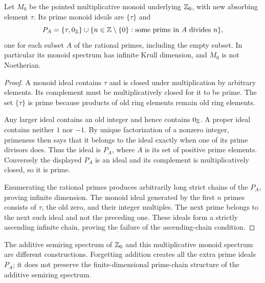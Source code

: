 \begin{proposition}\label{prop:monoid-spectrum}
Let $M_0$ be the pointed multiplicative monoid underlying $\mathbb Z_0$, with new absorbing element $\tau$. Its prime monoid ideals are $\{\tau\}$ and
\[
 P_A=\{\tau,0_\mathbb Z\}\cup
 \{n\in\mathbb Z\setminus\{0\}:\text{some prime in }A\text{ divides }n\},
\]
one for each subset $A$ of the rational primes, including the empty subset. In particular its monoid spectrum has infinite Krull dimension, and $M_0$ is not Noetherian.
\end{proposition}
\begin{proof}
A monoid ideal contains $\tau$ and is closed under multiplication by arbitrary elements. Its complement must be multiplicatively closed for it to be prime. The set $\{\tau\}$ is prime because products of old ring elements remain old ring elements.

Any larger ideal contains an old integer and hence contains $0_\mathbb Z$. A proper ideal contains neither $1$ nor $-1$. By unique factorization of a nonzero integer, primeness then says that it belongs to the ideal exactly when one of its prime divisors does. Thus the ideal is $P_A$, where $A$ is its set of positive prime elements. Conversely the displayed $P_A$ is an ideal and its complement is multiplicatively closed, so it is prime.

Enumerating the rational primes produces arbitrarily long strict chains of the $P_A$, proving infinite dimension. The monoid ideal generated by the first $n$ primes consists of $\tau$, the old zero, and their integer multiples. The next prime belongs to the next such ideal and not the preceding one. These ideals form a strictly ascending infinite chain, proving the failure of the ascending-chain condition.
\end{proof}

The additive semiring spectrum of $\mathbb Z_0$ and this multiplicative monoid spectrum are different constructions. Forgetting addition creates all the extra prime ideals $P_A$; it does not preserve the finite-dimensional prime-chain structure of the additive semiring spectrum.
